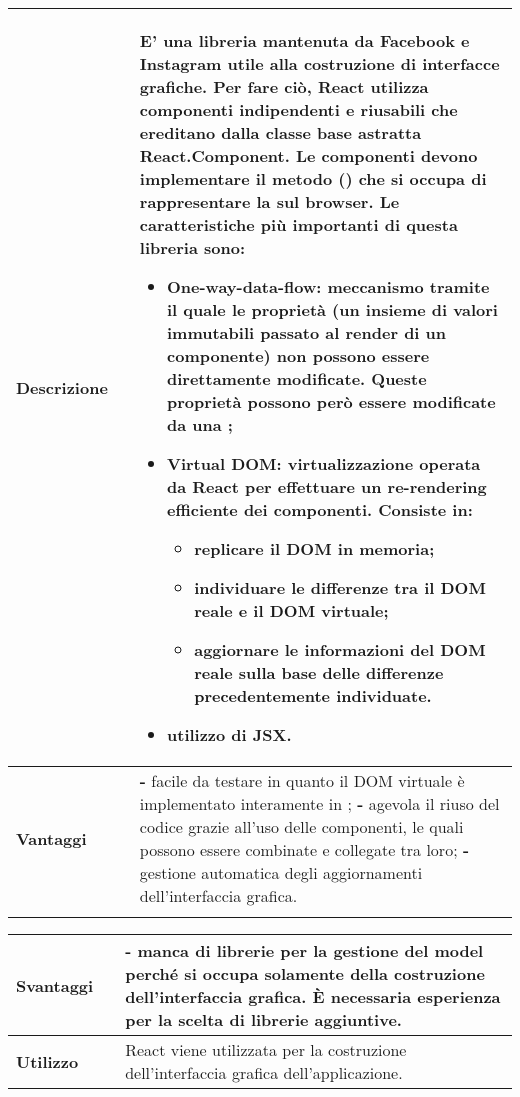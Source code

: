 \begin{table}[H]
	\centering
	\begin{tabular}{p{2cm}p{0.5cm}p{11.5cm}}
		\arrayrulecolor{lightgray}
		\toprule
		\textbf{Descrizione} & &
		E' una libreria \js{} \glo{Open source}{open source} mantenuta da Facebook e Instagram utile alla costruzione di interfacce grafiche. Per fare ciò, React utilizza componenti indipendenti e riusabili che ereditano dalla classe base astratta React.Component. Le componenti devono implementare il metodo \glo{Render}{render}() che si occupa di rappresentare la \glo{Componente}{componente} sul browser.
		Le caratteristiche più importanti di questa libreria sono:
		\begin{itemize}
			\item {\textbf{One-way-data-flow:}} meccanismo tramite il quale le proprietà (un insieme di valori immutabili passato al render di un componente) non possono essere direttamente modificate. Queste proprietà possono però essere modificate da una \glo{Callback}{callback};
			\item {\textbf{Virtual DOM:}} virtualizzazione operata da React per effettuare un re-rendering efficiente dei componenti. 
			Consiste in:
			\begin{itemize}
				\item replicare il DOM in memoria;
				\item individuare le differenze tra il DOM reale e il DOM virtuale;
				\item aggiornare le informazioni del DOM reale sulla base delle differenze precedentemente individuate.
			\end{itemize}
			\item utilizzo di JSX.
		\end{itemize}
		\\ \midrule \textbf{Vantaggi} & &
		\textbf{- }facile da testare in quanto il DOM virtuale è implementato interamente in \js;
		\newline
		\textbf{- }agevola il riuso del codice grazie all'uso delle componenti, le quali possono essere combinate e collegate tra loro;
		\newline
		\textbf{- } gestione automatica degli aggiornamenti dell'interfaccia grafica.
		\\ 
		\\ \bottomrule
	\end{tabular}
\end{table}

\begin{table}[H]
	\centering
	\begin{tabular}{p{2cm}p{0.5cm}p{11.5cm}}
		\arrayrulecolor{lightgray}
		\toprule	
		\textbf{Svantaggi} & &
		\textbf{- }manca di librerie per la gestione del model perché si occupa solamente della costruzione dell'interfaccia grafica. È necessaria esperienza per la scelta di librerie aggiuntive.
		\\ \midrule
		\textbf{Utilizzo} & &
		React viene utilizzata per la costruzione dell'interfaccia grafica dell'applicazione.
		\\ \bottomrule
	\end{tabular}
\end{table}


